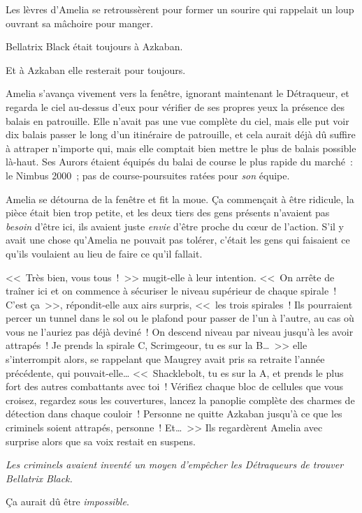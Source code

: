 Les lèvres d'Amelia se retroussèrent pour former un sourire qui rappelait un loup ouvrant sa mâchoire pour manger.

Bellatrix Black était toujours à Azkaban.

Et à Azkaban elle resterait pour toujours.

Amelia s'avança vivement vers la fenêtre, ignorant maintenant le Détraqueur, et regarda le ciel au-dessus d'eux pour vérifier de ses propres yeux la présence des balais en patrouille. Elle n'avait pas une vue complète du ciel, mais elle put voir dix balais passer le long d'un itinéraire de patrouille, et cela aurait déjà dû suffire à attraper n'importe qui, mais elle comptait bien mettre le plus de balais possible là-haut. Ses Aurors étaient équipés du balai de course le plus rapide du marché~: le Nimbus 2000~; pas de course-poursuites ratées pour \emph{son} équipe.

Amelia se détourna de la fenêtre et fit la moue. Ça commençait à être ridicule, la pièce était bien trop petite, et les deux tiers des gens présents n'avaient pas \emph{besoin} d'être ici, ils avaient juste \emph{envie} d'être proche du cœur de l'action. S'il y avait une chose qu'Amelia ne pouvait pas tolérer, c'était les gens qui faisaient ce qu'ils voulaient au lieu de faire ce qu'il fallait.

<<~Très bien, vous tous~!~>> mugit-elle à leur intention. <<~On arrête de traîner ici et on commence à sécuriser le niveau supérieur de chaque spirale~! C'est ça~>>, répondit-elle aux airs surpris, <<~les trois spirales~! Ils pourraient percer un tunnel dans le sol ou le plafond pour passer de l'un à l'autre, au cas où vous ne l'auriez pas déjà deviné~! On descend niveau par niveau jusqu'à les avoir attrapés~! Je prends la spirale C, Scrimgeour, tu es sur la B…~>> elle s'interrompit alors, se rappelant que Maugrey avait pris sa retraite l'année précédente, qui pouvait-elle… <<~Shacklebolt, tu es sur la A, et prends le plus fort des autres combattants avec toi~! Vérifiez chaque bloc de cellules que vous croisez, regardez sous les couvertures, lancez la panoplie complète des charmes de détection dans chaque couloir~! Personne ne quitte Azkaban jusqu'à ce que les criminels soient attrapés, personne~! Et…~>> Ils regardèrent Amelia avec surprise alors que sa voix restait en suspens.

\emph{Les criminels avaient inventé un moyen d'empêcher les Détraqueurs de trouver Bellatrix Black.}

Ça aurait dû être \emph{impossible}.

